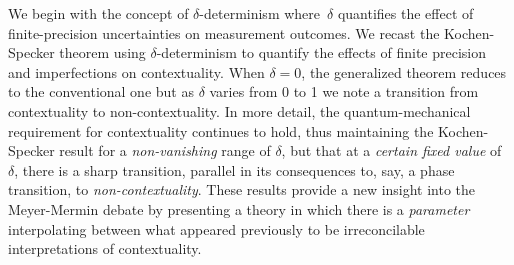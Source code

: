 \documentclass[english,reprint, aps, prl,superscriptaddress, showpacs,
showkeys, longbibliography, amsmath, amssymb, floatfix]{revtex4-1}
\theoremstyle{plain}
\theoremstyle{definition}
\newcommand{\yutsung}[1]{\begin{framed}\begin{minipage}{0.9\linewidth}\color{purple}{Yu-Tsung says: #1}\end{minipage}\end{framed}}
\begin{document}
We begin with the concept of $\delta$-determinism where~$\delta$
quantifies the effect of finite-precision uncertainties on measurement
outcomes. We recast the Kochen-Specker theorem using
$\delta$-determinism to quantify the effects of finite precision and
imperfections on contextuality. When $\delta=0$, the generalized
theorem reduces to the conventional one but as $\delta$ varies from 0
to 1 we note a transition from contextuality to non-contextuality.
In more detail, the quantum-mechanical requirement for contextuality
continues to hold, thus maintaining the Kochen-Specker result for a
\emph{non-vanishing} range of $\delta$, but that at a \emph{certain
  fixed value} of $\delta$, there is a sharp transition, parallel in
its consequences to, say, a phase transition, to
\emph{non-contextuality}. %
These results provide a new insight into the Meyer-Mermin debate by
presenting a theory in which there is a \emph{parameter} interpolating
between what appeared previously to be irreconcilable interpretations
of contextuality.
\end{document}
